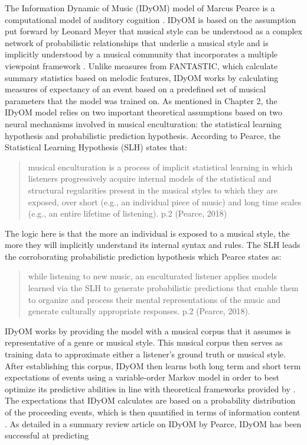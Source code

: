\documentclass[12pt,]{book}
\begin{document}
The Information Dynamic of Music (IDyOM) model of Marcus Pearce is a computational model of auditory cognition \citep{pearceStatisticalLearningProbabilistic2018a}.
IDyOM is based on the assumption put forward by Leonard Meyer that musical style can be understood as a complex network of probabilistic relationships that underlie a musical style and is implicitly understood by a musical community \citep{pearceAuditoryExpectationInformation2012, pearceConstructionEvaluationStatistical2005, pearceStatisticalLearningProbabilistic2018a} that incorporates a multiple viewpoint framework \citep{conklinMultipleViewpointSystems1995}.
Unlike measures from FANTASTIC, which calculate summary statistics based on melodic features, IDyOM works by calculating measures of expectancy of an event based on a predefined set of musical parameters that the model was trained on.
As mentioned in Chapter 2, the IDyOM model relies on two important theoretical assumptions based on two neural mechanisms involved in musical enculturation: the statistical learning hypothesis and probabilistic prediction hypothesis.
According to Pearce, the Statistical Learning Hypothesis (SLH) states that:

\begin{quote}
musical enculturation is a process of implicit statistical learning in which listeners progressively acquire internal models of the statistical and structural regularities present in the musical styles to which they are exposed, over short (e.g., an individual piece of music) and long time scales (e.g., an entire lifetime of listening). p.2 (Pearce, 2018)
\end{quote}

The logic here is that the more an individual is exposed to a musical style, the more they will implicitly understand its internal syntax and rules.
The SLH leads the corroborating probabilistic prediction hypothesis which Pearce states as:

\begin{quote}
while listening to new music, an enculturated listener applies models learned via the SLH to generate probabilistic predictions that enable them to organize and process their mental representations of the music and generate culturally appropriate responses. p.2 (Pearce, 2018).
\end{quote}

IDyOM works by providing the model with a musical corpus that it assumes is representative of a genre or musical style.
This musical corpus then serves as training data to approximate either a listener's ground truth or musical style.
After establishing this corpus, IDyOM then learns both long term and short term expectations of events using a variable-order Markov model in order to best optimize its predictive abilities in line with theoretical frameworks provided by \citet{conklinMultipleViewpointSystems1995}.
The expectations that IDyOM calculates are based on a probability distribution of the proceeding events, which is then quantified in terms of information content \citep{shannonMathematicalTheoryCommunication1948}.
As detailed in a summary review article on IDyOM by Pearce, IDyOM has been successful at predicting
\end{document}
